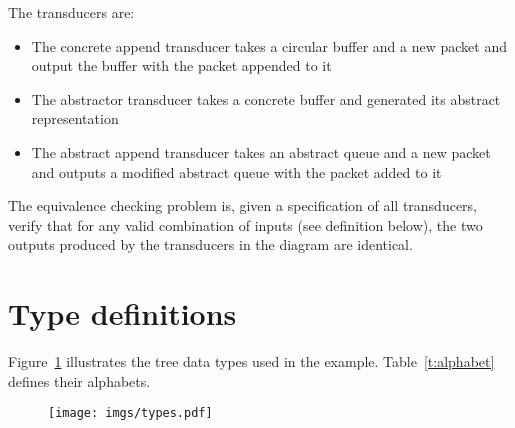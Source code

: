 \documentclass{article}
\begin{document}
The transducers are:
\begin{itemize}
    \item The concrete append transducer takes a circular buffer 
        and a new packet and output the buffer with the packet 
        appended to it
    \item The abstractor transducer takes a concrete buffer and 
        generated its abstract representation
    \item The abstract append transducer takes an abstract queue 
        and a new packet and outputs a modified abstract queue 
        with the packet added to it
\end{itemize}

The equivalence checking problem is, given a specification of all 
transducers, verify that for any valid combination of inputs (see 
definition below), the two outputs produced by the transducers in 
the diagram are identical.

\section{Type definitions}

Figure~\ref{f:types} illustrates the tree data types used in the 
example.  Table~\ref{t:alphabet} defines their alphabets.  

\begin{figure}[t]
    \center
    \texttt{[image: imgs/types.pdf]}
    \caption{}\label{f:types}
\end{figure}
\end{document}
